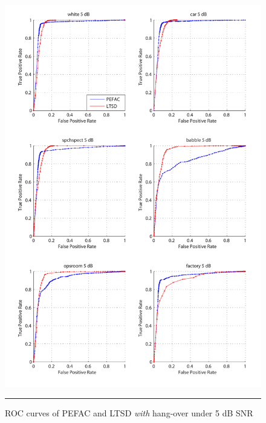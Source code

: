\begin{figure}[htbp]
	\centering
		\includegraphics[width=1.0\columnwidth]{Figures/Chapter5/pefac5.pdf}
		\rule{37em}{0.5pt}
	\caption[ROC curves of PEFAC and LTSD \emph{with} hang-over under 5 dB SNR]{ROC curves of PEFAC and LTSD \emph{with} hang-over under 5 dB SNR}
	\label{fig:pefac5}
\end{figure}

